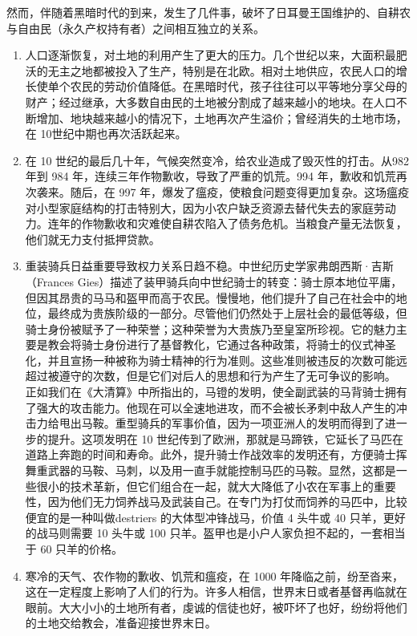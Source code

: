 然而，伴随着黑暗时代的到来，发生了几件事，破坏了日耳曼王国维护的、自耕农与自由民（永久产权持有者）之间相互独立的关系。

\begin{enumerate}
    \item 人口逐渐恢复，对土地的利用产生了更大的压力。几个世纪以来，大面积最肥沃的无主之地都被投入了生产，特别是在北欧。相对土地供应，农民人口的增长使单个农民的劳动价值降低。在黑暗时代，孩子往往可以平等地分享父母的财产；经过继承，大多数自由民的土地被分割成了越来越小的地块。在人口不断增加、地块越来越小的情况下，土地再次产生溢价；曾经消失的土地市场，在 10世纪中期也再次活跃起来。
    \item 在 10 世纪的最后几十年，气候突然变冷，给农业造成了毁灭性的打击。从982 年到 984 年，连续三年作物歉收，导致了严重的饥荒。994 年，歉收和饥荒再次袭来。随后，在 997 年，爆发了瘟疫，使粮食问题变得更加复杂。这场瘟疫对小型家庭结构的打击特别大，因为小农户缺乏资源去替代失去的家庭劳动力。连年的作物歉收和灾难使自耕农陷入了债务危机。当粮食产量无法恢复，他们就无力支付抵押贷款。
    \item 重装骑兵日益重要导致权力关系日趋不稳。中世纪历史学家弗朗西斯·吉斯（Frances Gies）描述了装甲骑兵向中世纪骑士的转变：骑士原本地位平庸，但因其昂贵的马马和盔甲而高于农民。慢慢地，他们提升了自己在社会中的地位，最终成为贵族阶级的一部分。尽管他们仍然处于上层社会的最低等级，但骑士身份被赋予了一种荣誉；这种荣誉为大贵族乃至皇室所珍视。它的魅力主要是教会将骑士身份进行了基督教化，它通过各种政策，将骑士的仪式神圣化，并且宣扬一种被称为骑士精神的行为准则。这些准则被违反的次数可能远超过被遵守的次数，但是它们对后人的思想和行为产生了无可争议的影响。 正如我们在《大清算》中所指出的，马镫的发明，使全副武装的马背骑士拥有了强大的攻击能力。他现在可以全速地进攻，而不会被长矛刺中敌人产生的冲击力给甩出马鞍。重型骑兵的军事价值，因为一项亚洲人的发明而得到了进一步的提升。这项发明在 10 世纪传到了欧洲，那就是马蹄铁，它延长了马匹在道路上奔跑的时间和寿命。此外，提升骑士作战效率的发明还有，方便骑士挥舞重武器的马鞍、马刺，以及用一直手就能控制马匹的马鞍。显然，这都是一些很小的技术革新，但它们组合在一起，就大大降低了小农在军事上的重要性，因为他们无力饲养战马及武装自己。在专门为打仗而饲养的马匹中，比较便宜的是一种叫做destriers 的大体型冲锋战马，价值 4 头牛或 40 只羊，更好的战马则需要 10 头牛或 100 只羊。盔甲也是小户人家负担不起的，一套相当于 60 只羊的价格。
    \item 寒冷的天气、农作物的歉收、饥荒和瘟疫，在 1000 年降临之前，纷至沓来，这在一定程度上影响了人们的行为。许多人相信，世界末日或者基督再临就在眼前。大大小小的土地所有者，虔诚的信徒也好，被吓坏了也好，纷纷将他们的土地交给教会，准备迎接世界末日。
\end{enumerate}

